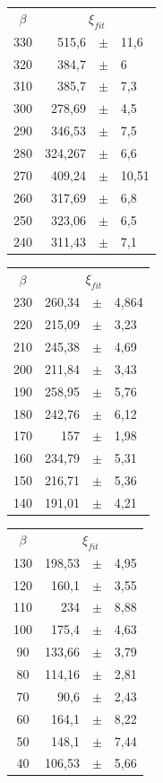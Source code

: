      \begin{minipage}{0.3\textwidth}
		\begin{tabular}{|c|r c l| }
			\hline \footnotesize
			$\beta$	&\multicolumn{3}{|c|}{$\xi_{fit}$	} \\
330	&515,6	&$\pm$	&11,6\\
320	&384,7	&$\pm$	&6\\
310	&385,7	&$\pm$	&7,3\\
300	&278,69	&$\pm$	&4,5\\
290	&346,53	&$\pm$	& 7,5\\
280	&324,267	&$\pm$	& 6,6\\
270	&409,24	&$\pm$	& 10,51\\
260	&317,69	&$\pm$	& 6,8\\
250	&323,06	&$\pm$	& 6,5\\
240	&311,43	&$\pm$	& 7,1\\

\hline
\end{tabular}
     \end{minipage}\hfill
     \begin{minipage}{0.3\textwidth}
\begin{tabular}{|c|r c l| }
\hline \footnotesize
$\beta$	&\multicolumn{3}{|c|}{$\xi_{fit}$	} \\
230	&260,34	&$\pm$	& 4,864\\
220	&215,09	&$\pm$	& 3,23\\
210	&245,38	&$\pm$	& 4,69\\
200	&211,84	&$\pm$	& 3,43\\
190	&258,95	&$\pm$	& 5,76\\
180	&242,76	&$\pm$	& 6,12\\
170	&157	&$\pm$	& 1,98\\
160	&234,79	&$\pm$	& 5,31\\
150	&216,71	&$\pm$	& 5,36\\
140	&191,01	&$\pm$	& 4,21\\

\hline
\end{tabular}
     \end{minipage}\hfill
     \begin{minipage}{0.3\textwidth}
\begin{tabular}{|c|r c l| }
\hline \footnotesize
$\beta$	&\multicolumn{3}{|c|}{$\xi_{fit}$	} \\
130	&198,53	&$\pm$	& 4,95\\
120	&160,1	&$\pm$	& 3,55\\
110	&234	&$\pm$	& 8,88\\
100	&175,4	&$\pm$	& 4,63\\
90	&133,66	&$\pm$	& 3,79\\
80	&114,16	&$\pm$	& 2,81\\
70	&90,6	&$\pm$	& 2,43\\
60	&164,1	&$\pm$	& 8,22\\
50	&148,1	&$\pm$	& 7,44\\
40	&106,53	&$\pm$	& 5,66\\
\hline
\end{tabular}
     \end{minipage}\hfill

